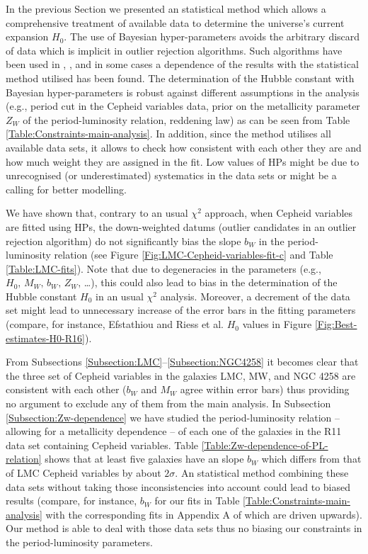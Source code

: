 In the previous Section we presented an statistical method which allows a comprehensive treatment of available data to determine the universe's current expansion $H_0$. The use of Bayesian hyper-parameters avoids the arbitrary discard of data which is implicit in outlier rejection algorithms. Such algorithms have been used in  \cite{Riess:2009pu}, \cite{Riess:2011yx}, \cite{Efstathiou:2013via} and in some cases a dependence of the results with the statistical method utilised has been found. The determination of the Hubble constant with Bayesian hyper-parameters is robust against different assumptions in the analysis (e.g., period cut in the Cepheid variables data, prior on the metallicity parameter $Z_W$ of the period-luminosity relation, reddening law) as can be seen from Table \ref{Table:Constraints-main-analysis}. In addition, since the method utilises all available data sets, it allows to check how consistent with each other they are and how much weight they are assigned in the fit. Low values of HPs might be due to unrecognised (or underestimated) systematics in the data sets or might be a calling for better modelling.

We have shown that, contrary to an usual $\chi^2$ approach, when Cepheid variables are fitted using HPs, the down-weighted datums (outlier candidates in an outlier rejection algorithm) do not significantly bias the slope $b_W$ in the period-luminosity relation (see Figure \ref{Fig:LMC-Cepheid-variables-fit-c} and Table \ref{Table:LMC-fits}). Note that due to degeneracies in the parameters (e.g., $H_0,\, M_W,\, b_W,\, Z_W,\,$\dots), this could also lead to bias in the determination of the Hubble constant $H_0$ in an usual $\chi^2$ analysis. Moreover, a decrement of the data set might lead to unnecessary increase of the error bars in the fitting parameters (compare, for instance, Efstathiou \cite{Efstathiou:2013via} and Riess et al. \cite{Riess:2011yx} $H_0$ values in Figure \ref{Fig:Best-estimates-H0-R16}).

From Subsections \ref{Subsection:LMC}--\ref{Subsection:NGC4258} it becomes clear that the three set of Cepheid variables in the galaxies LMC, MW, and NGC 4258 are consistent with each other ($b_W$ and $M_W$ agree within error bars) thus providing no argument to exclude any of them from the main analysis. In Subsection \ref{Subsection:Zw-dependence} we have studied the period-luminosity relation -- allowing for a metallicity dependence -- of each one of the galaxies in the R11 data set containing Cepheid variables. Table \ref{Table:Zw-dependence-of-PL-relation} shows that at least five galaxies have an slope $b_W$ which differs from that of LMC Cepheid variables by about $2\sigma$. An statistical method combining these data sets without taking those inconsistencies into account could lead to biased results (compare, for instance, $b_W$ for our fits in Table \ref{Table:Constraints-main-analysis} with the corresponding fits in Appendix A of \cite{Efstathiou:2013via} which are driven upwards). Our method is able to deal with those data sets thus no biasing our constraints in the period-luminosity parameters.

